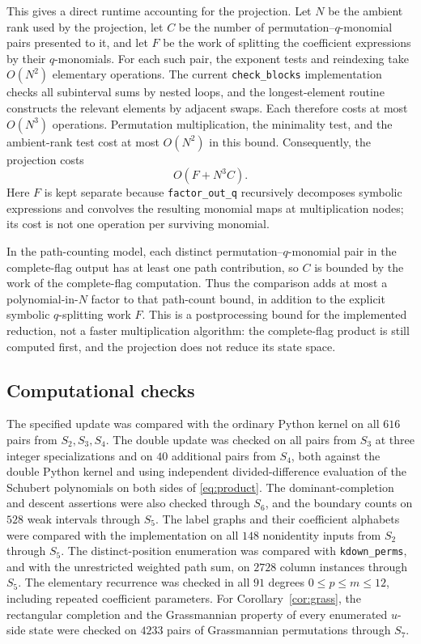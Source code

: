\documentclass{amsart}
\theoremstyle{definition}
\theoremstyle{remark}
\numberwithin{equation}{section}
\begin{document}
This gives a direct runtime accounting for the projection. Let $N$ be
the ambient rank used by the projection, let $C$ be the number of
permutation--$q$-monomial pairs presented to it, and let $F$ be the work
of splitting the coefficient expressions by their $q$-monomials.
For each such pair, the exponent tests and reindexing take
$O(N^2)$ elementary operations. The current \texttt{check\_blocks}
implementation checks all subinterval sums by nested loops, and the
longest-element routine constructs the relevant elements by adjacent
swaps. Each therefore costs at most $O(N^3)$ operations. Permutation
multiplication, the minimality test, and the ambient-rank test cost at
most $O(N^2)$ in this bound. Consequently, the projection costs
\[
 O(F+N^3 C).
\]
Here $F$ is kept separate because \texttt{factor\_out\_q} recursively
decomposes symbolic expressions and convolves the resulting monomial
maps at multiplication nodes; its cost is not one operation per
surviving monomial.

In the path-counting model, each distinct permutation--$q$-monomial
pair in the complete-flag output has at least one path contribution, so
$C$ is bounded by the work of the complete-flag computation. Thus the
comparison adds at most a polynomial-in-$N$ factor to that path-count
bound, in addition to the explicit symbolic $q$-splitting work $F$.
This is a postprocessing bound for the implemented reduction, not a
faster multiplication algorithm: the complete-flag product is still
computed first, and the projection does not reduce its state space.

\subsection{Computational checks}

The specified update was compared with the
ordinary Python kernel on all $616$ pairs from $S_2,S_3,S_4$.
The double update was checked on all pairs from $S_3$ at three
integer specializations and on $40$ additional pairs from $S_4$,
both against the double Python kernel and using independent
divided-difference evaluation of the Schubert polynomials on both
sides of \eqref{eq:product}.
The dominant-completion and descent assertions were also checked
through $S_6$, and the boundary counts on $528$ weak intervals
through $S_5$.
The label graphs and their coefficient alphabets were compared with
the implementation on all $148$ nonidentity inputs from $S_2$ through $S_5$.
The distinct-position enumeration was compared with
\texttt{kdown\_perms}, and with the unrestricted weighted path sum,
on $2728$ column instances through $S_5$.
The elementary recurrence was checked in all $91$ degrees
$0\leq p\leq m\leq12$, including repeated coefficient parameters.
For Corollary~\ref{cor:grass}, the rectangular completion and the
Grassmannian property of every enumerated $u$-side state were checked
on $4233$ pairs of Grassmannian permutations through $S_7$.
\end{document}
